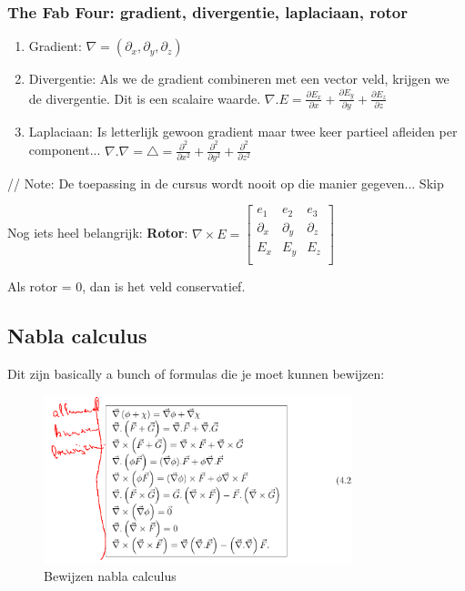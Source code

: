 \documentclass[a4paper]{report}
\begin{document}
\subsubsection{The Fab Four: gradient, divergentie, laplaciaan, rotor}

\begin{enumerate}

	\item Gradient: $\nabla = (\partial_x, \partial_y, \partial_z)$
	\item Divergentie: Als we de gradient combineren met een vector veld, krijgen we de divergentie. Dit is een scalaire waarde. $\nabla . E = \frac{\partial E_x}{\partial x} + \frac{\partial E_y}{\partial y} + \frac{\partial E_z}{\partial z}$
	\item Laplaciaan: Is letterlijk gewoon gradient maar twee keer partieel afleiden per component... $\nabla . \nabla = \triangle = \frac{\partial^2}{\partial x^2} + \frac{\partial^2}{\partial y^2} + \frac{\partial^2}{\partial z^2}$
\end{enumerate}

// Note: De toepassing in de cursus wordt nooit op die manier gegeven... Skip

Nog iets heel belangrijk: \textbf{Rotor}: $\nabla \times E = \begin{bmatrix} e_1 & e_2 & e_3 \\ \partial_x & \partial_y & \partial_z \\ E_x & E_y & E_z \\ \end{bmatrix}$

Als rotor = 0, dan is het veld conservatief.

\subsection{Nabla calculus}

Dit zijn basically a bunch of formulas die je moet kunnen bewijzen:


\begin{figure}[H]
	\centering
	\includegraphics[width=0.8\textwidth]{assets/bewijzen_nabla_calculus.png}
	\caption{Bewijzen nabla calculus}
	\label{fig:bewijzen_nabla_calculus}
\end{figure}
\end{document}
